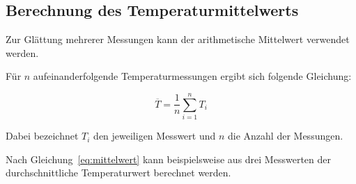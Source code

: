 \documentclass[a4paper,11pt]{article}
\begin{document}
\subsection{Berechnung des Temperaturmittelwerts}

Zur Glättung mehrerer Messungen kann der
arithmetische Mittelwert verwendet werden.

Für $n$ aufeinanderfolgende Temperaturmessungen
ergibt sich folgende Gleichung:

\begin{equation}
    \overline{T} =
    \frac{1}{n}\sum_{i=1}^{n} T_i
    \label{eq:mittelwert}
\end{equation}

Dabei bezeichnet $T_i$ den jeweiligen Messwert
und $n$ die Anzahl der Messungen.

Nach Gleichung~\ref{eq:mittelwert} kann beispielsweise
aus drei Messwerten der durchschnittliche
Temperaturwert berechnet werden.



\end{document}
